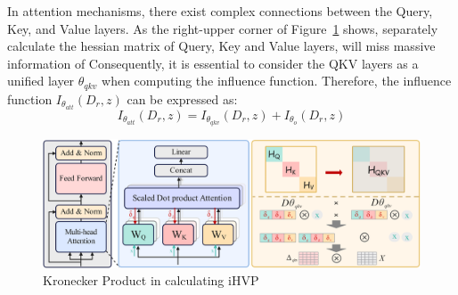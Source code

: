 \documentclass{article} %
\begin{document}

In attention mechanisms, there exist complex connections between the Query, Key, and Value layers. As the right-upper corner of Figure~\ref{multi-head-attention} shows, separately calculate the hessian matrix of Query, Key and Value layers, will miss massive information of 
Consequently, it is essential to consider the QKV layers as a unified layer $\theta_{qkv}$ when computing the influence function. Therefore, the influence function $I_{\theta_{att}}(D_r, z)$ can be expressed as:
\begin{equation}
I_{\theta_{att}}(D_r, z) = I_{\theta_{qkv}}(D_r, z) + I_{\theta_{o}}(D_r, z)
\end{equation}


\begin{figure}[h]
\begin{center}
\includegraphics[width=1\textwidth]{multi-head-attention.png}
\end{center}
\caption{Kronecker Product in calculating iHVP}
\label{multi-head-attention}
\end{figure}
\end{document}
